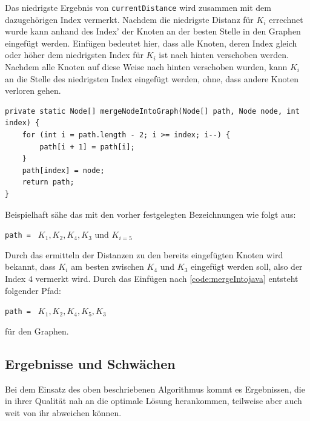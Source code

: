 Das niedrigste Ergebnis von \lstinline{currentDistance} wird zusammen mit dem dazugehörigen Index vermerkt. Nachdem die niedrigste Distanz für $K_i$ errechnet wurde kann anhand des Index' der Knoten an der besten Stelle in den Graphen eingefügt werden. 
Einfügen bedeutet hier, dass alle Knoten, deren Index gleich oder höher dem niedrigsten Index für $K_i$ ist nach hinten verschoben werden. Nachdem alle Knoten auf diese Weise nach hinten verschoben wurden, kann $K_i$ an die Stelle des niedrigsten Index eingefügt werden, ohne, dass andere Knoten verloren gehen.
\begin{lstlisting}[caption={Einfügen von Knoten in einen bestehenden Graph}, label={lst:mergeIntojava}]
private static Node[] mergeNodeIntoGraph(Node[] path, Node node, int index) {
    for (int i = path.length - 2; i >= index; i--) {
        path[i + 1] = path[i];
    }
    path[index] = node;
    return path;
}
\end{lstlisting}
Beispielhaft sähe das mit den vorher festgelegten Bezeichnungen wie folgt aus: 
\begin{addmargin}[1em]{2em}
\lstinline{path = } $K_1, K_2, K_4, K_3$ und $K_{i = 5}$ 
\end{addmargin}
Durch das ermitteln der Distanzen zu den bereits eingefügten Knoten wird bekannt, dass $K_i$ am besten zwischen $K_4$ und $K_3$ eingefügt werden soll, also der Index $4$ vermerkt wird. Durch das Einfügen nach \vref{code:mergeIntojava} entsteht folgender Pfad:
\begin{addmargin}[1em]{2em}
\lstinline{path = } $K_1, K_2, K_4, K_5, K_3$
\end{addmargin}
für den Graphen.

\subsection{Ergebnisse und Schwächen}
Bei dem Einsatz des oben beschriebenen Algorithmus kommt es Ergebnissen, die in ihrer Qualität nah an die optimale Lösung herankommen, teilweise aber auch weit von ihr abweichen können.

    

